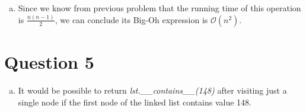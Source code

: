 \documentclass[12pt]{article}
\begin{document}
\begin{enumerate}[a.]
\begin{mdframed}
        \bigskip

        When $n = 1$, the total number of nodes traversed is 0. This is because
        we are only replacing None in \textit{self.\_first} with \textit{\_Node(item)}.

        \bigskip

        When \color{red}$n > 1$, we know the number of nodes traversal
        required to add an item increases by 1 starting with the $2^{nd}$
        element\color{black}\:and this continues until $n - 1$ (where it represents
        the last item in a list). So in this case, the total number of nodes traversed is

        \begin{align}
            \sum\limits_{i=1}^{n-1} i &= \frac{n(n-1)}{2}
        \end{align}
    \end{mdframed}

    \bigskip

    \underline{\textbf{Notes:}}

    \bigskip

    \begin{itemize}
        \item I am feeling blue. I feel csc 148 worksheets are designed
        to be used in class, with details and expectations to questions
        learned as students are interacting with professor.

        \item Learned that the number of node traversed means the
        number of nodes that needs to be traveled to get to the closest None.

        \bigskip

    \end{itemize}

    \item

    Since we know from previous problem that the running time of this operation
    is $\frac{n(n-1)}{2}$, we can conclude its Big-Oh expression is $\mathcal{O}(n^2)$.

\end{enumerate}

\section*{Question 5}
\begin{enumerate}[a.]
    \item It would be possible to return \textit{lst.\_\_contains\_\_(148)}
    after visiting just a single node if the first node of the linked list contains
    value 148.
\end{enumerate}
\end{document}
